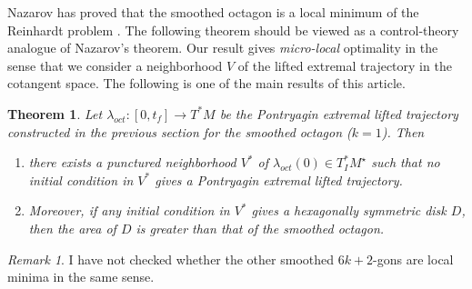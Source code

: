 \documentclass{article}
\newtheorem{theorem}{Theorem}[subsection]
\theoremstyle{remark}
\newtheorem{remark}[equation]{Remark}%
\def\Mstar{M^\star}
\begin{document}
Nazarov has proved that the smoothed octagon is a local minimum of the
Reinhardt problem \cite{nazarov1988reinhardt}.  The following theorem
should be viewed as a control-theory analogue of Nazarov's theorem.
Our result gives {\it micro-local} optimality in the sense that we
consider a neighborhood $V$ of the lifted extremal trajectory in the
cotangent space.  The following is one of the main results of this
article.

\begin{theorem}\label{thm:local-min} Let $\lambda_{oct}:[0,t_f]\to T^*M$
  be the Pontryagin extremal lifted trajectory constructed in the
  previous section for the smoothed octagon ($k=1$).  Then
\begin{enumerate}
\item there exists a punctured neighborhood $V^*$ of
  $\lambda_{oct}(0)\in T_I^*\Mstar$
  such that no initial condition in $V^*$ gives a Pontryagin extremal
  lifted trajectory.
\item Moreover, if any initial condition in $V^*$ gives a hexagonally
  symmetric disk $D$, then the area of $D$ is greater than that of the
  smoothed octagon.
\end{enumerate}
\end{theorem}

\begin{remark}
I have not checked whether the other smoothed $6k+2$-gons are
local minima in the same sense.
\end{remark}
\end{document}
